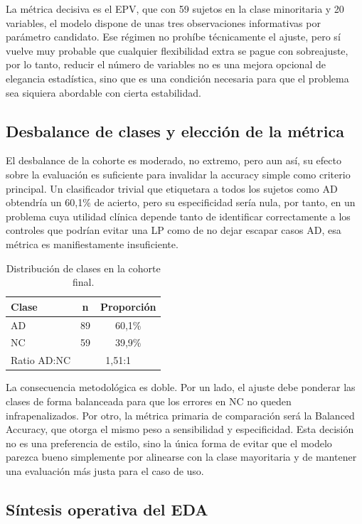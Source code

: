 La métrica decisiva es el EPV, que con 59 sujetos en la clase minoritaria y 20 variables, el modelo dispone de unas tres
observaciones informativas por parámetro candidato. Ese régimen no prohíbe técnicamente el ajuste, pero sí vuelve muy
probable que cualquier flexibilidad extra se pague con sobreajuste, por lo tanto, reducir el número de variables no es
una mejora opcional de elegancia estadística, sino que es una condición necesaria para que el problema sea siquiera
abordable con cierta estabilidad.

\subsection{Desbalance de clases y elección de la métrica}

El desbalance de la cohorte es moderado, no extremo, pero aun así, su efecto sobre la evaluación es suficiente para
invalidar la accuracy simple como criterio principal. Un clasificador trivial que etiquetara a todos los sujetos como AD
obtendría un 60,1\% de acierto, pero su especificidad sería nula, por tanto, en un problema cuya utilidad clínica
depende tanto de identificar correctamente a los controles que podrían evitar una LP como de no dejar escapar casos AD,
esa métrica es manifiestamente insuficiente.

\begin{table}[ht]
\centering
\caption{Distribución de clases en la cohorte final.}
\label{tab:clases_eda}
\begin{tabular}{lcc}
\hline
\textbf{Clase} & \textbf{n} & \textbf{Proporción} \\
\hline
AD & 89 & 60,1\% \\
NC & 59 & 39,9\% \\
Ratio AD:NC & \multicolumn{2}{c}{1,51:1} \\
\hline
\end{tabular}
\end{table}

La consecuencia metodológica es doble. Por un lado, el ajuste debe ponderar las clases de forma balanceada para que los
errores en NC no queden infrapenalizados. Por otro, la métrica primaria de comparación será la Balanced Accuracy, que
otorga el mismo peso a sensibilidad y especificidad. Esta decisión no es una preferencia de estilo, sino la única forma
de evitar que el modelo parezca bueno simplemente por alinearse con la clase mayoritaria y de mantener una evaluación
más justa para el caso de uso.

\subsection{Síntesis operativa del EDA}

